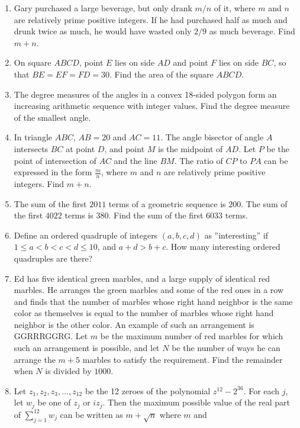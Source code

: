 \documentclass{article}
\begin{document}
\begin{enumerate}[label=\arabic*., itemsep=0.5em]
\item Gary purchased a large beverage, but only drank \(m/n\) of it, where \(m\) and \(n\) are relatively prime positive integers. If he had purchased half as much and drunk twice as much, he would have wasted only \(2/9\) as much beverage. Find \(m+n\).\par \vspace{0.5em}\item On square \(ABCD\), point \(E\) lies on side \(AD\) and point \(F\) lies on side \(BC\), so that \(BE=EF=FD=30\). Find the area of the square \(ABCD\).\par \vspace{0.5em}\item The degree measures of the angles in a convex 18-sided polygon form an increasing arithmetic sequence with integer values. Find the degree measure of the smallest angle.\par \vspace{0.5em}\item In triangle \(ABC\), \(AB=20\) and \(AC=11\). The angle bisector of angle \(A\) intersects \(BC\) at point \(D\), and point \(M\) is the midpoint of \(AD\). Let \(P\) be the point of intersection of \(AC\) and the line \(BM\). The ratio of \(CP\) to \(PA\) can be expressed in the form \(\frac{m}{n}\), where \(m\) and \(n\) are relatively prime positive integers. Find \(m+n\).\par \vspace{0.5em}\item The sum of the first \(2011\) terms of a geometric sequence is \(200\). The sum of the first \(4022\) terms is \(380\). Find the sum of the first \(6033\) terms.\par \vspace{0.5em}\item Define an ordered quadruple of integers \((a, b, c, d)\) as ''interesting'' if \(1 \le a<b<c<d \le 10\), and \( a+d>b+c \). How many interesting ordered quadruples are there?\par \vspace{0.5em}\item Ed has five identical green marbles, and a large supply of identical red marbles. He arranges the green marbles and some of the red ones in a row and finds that the number of marbles whose right hand neighbor is the same color as themselves is equal to the number of marbles whose right hand neighbor is the other color. An example of such an arrangement is GGRRRGGRG. Let \(m\) be the maximum number of red marbles for which such an arrangement is possible, and let \(N\) be the number of ways he can arrange the \(m+5\) marbles to satisfy the requirement. Find the remainder when \(N\) is divided by \(1000\).\par \vspace{0.5em}\item Let \(z_1,z_2,z_3,\dots,z_{12}\) be the 12 zeroes of the polynomial \(z^{12}-2^{36}\). For each \(j\), let \(w_j\) be one of \(z_j\) or \(i z_j\). Then the maximum possible value of the real part of \(\sum_{j=1}^{12} w_j\) can be written as \(m+\sqrt{n}\) where \(m\) and 
\end{enumerate}
\end{document}
